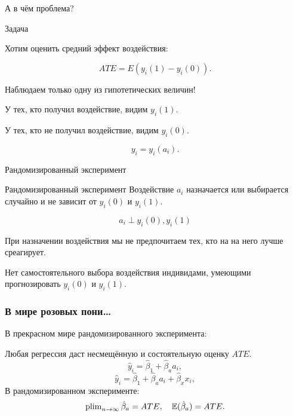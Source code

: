 \begin{frame}{А в чём проблема?}

\begin{block}{Задача}

    Хотим оценить \alert{средний эффект воздействия}:
    
    \[
    ATE  = E(y_i(1) - y_i(0)).
    \]
\end{block}

\pause

Наблюдаем \alert{только одну} из гипотетических величин!

У тех, кто получил воздействие, видим $y_i(1)$.

У тех, кто не получил воздействие, видим $y_i(0)$.

\[
y_i = y_i(a_i).  
\]


\end{frame}



\begin{frame}{Рандомизированный эксперимент}


\begin{block}{Рандомизированный эксперимент}
Воздействие $a_i$ назначается или выбирается случайно и не зависит от $y_i(0)$ и $y_i(1)$.

\[
  a_i \perp y_i(0), y_i(1)
\]

\end{block}

\pause
При назначении воздействия мы \alert{не предпочитаем} тех, кто на на него лучше среагирует. 


\alert{Нет самостоятельного выбора} воздействия индивидами, умеющими прогнозировать $y_i(0)$ и $y_i(1)$.

\end{frame}



\begin{frame}
  \frametitle{В мире розовых пони\ldots}

  В прекрасном мире \alert{рандомизированного эксперимента}:

  \alert{Любая} регрессия даст несмещённую и состоятельную оценку $ATE$.
  \pause
  \[
  \hat y_i = \hat \beta_1 + \hat \beta_a a_i,  
  \]
  \pause
  \[
  \hat y_i = \hat \beta_1 + \hat \beta_a a_i + \hat \beta_x x_i,  
  \]
  \pause
  В рандомизированном эксперименте:
  \[
  \operatorname{plim}_{n\to\infty} \hat \beta_a = ATE, \quad \mathbb{E}(\hat\beta_a) = ATE.  
  \]


\end{frame}

